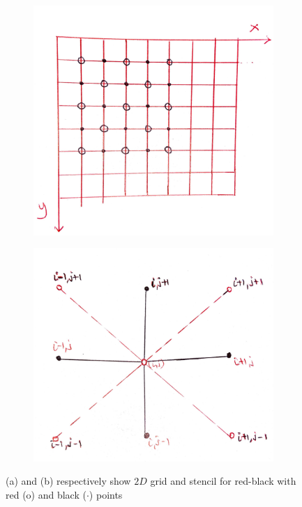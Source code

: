 \documentclass[12pt,a4paper]{article}
\begin{document}
	
	\begin{figure}[H]
		\begin{subfigure}[b]{0.5\textwidth}
			\centering
			\includegraphics[width=1.0\linewidth]{"red-black"}
			\caption{}
			\label{fig:redblackgrid}
		\end{subfigure}
		\begin{subfigure}[b]{0.5\textwidth}
			\centering
			\includegraphics[width=1.0\linewidth]{"stencil"}
			\caption{}
			\label{fig:redblackstencil}
		\end{subfigure}
		\caption{(a) and (b) respectively show $2D$ grid   and stencil for red-black with red (o) and black ($\cdot$) points }
	\end{figure}
	
\end{document}
